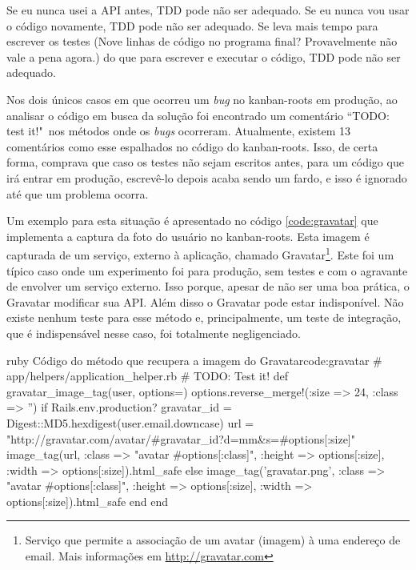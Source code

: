 \begin{citacao}
Se eu nunca usei a API antes, TDD pode não ser adequado. Se eu nunca vou usar o código novamente, TDD pode não ser adequado. Se leva mais tempo para escrever os testes (Nove linhas de código no programa final? Provavelmente não vale a pena agora.) do que para escrever e executar o código, TDD pode não ser adequado.
\end{citacao}

Nos dois únicos casos em que ocorreu um \textit{bug} no kanban-roots em produção, ao analisar o código em busca da solução foi encontrado um comentário ``TODO: test it!"\ nos métodos onde os \textit{bugs} ocorreram. Atualmente, existem 13 comentários como esse espalhados no código do kanban-roots. Isso, de certa forma, comprava que caso os testes não sejam escritos antes, para um código que irá entrar em produção, escrevê-lo depois acaba sendo um fardo, e isso é ignorado até que um problema ocorra.

Um exemplo para esta situação é apresentado no código \ref{code:gravatar} que implementa a captura da foto do usuário no kanban-roots. Esta imagem é capturada de um serviço, externo à aplicação, chamado Gravatar\footnote{Serviço que permite a associação de um avatar (imagem) à uma endereço de email. Mais informações em \url{http://gravatar.com}}. Este foi um típico caso onde um experimento foi para produção, sem testes e com o agravante de envolver um serviço externo. Isso porque, apesar de não ser uma boa prática, o Gravatar modificar sua API. Além disso o Gravatar pode estar indisponível. Não existe nenhum teste para esse método e, principalmente, um teste de integração, que é indispensável nesse caso, foi totalmente negligenciado.

\begin{mycode}{ruby}%
{Código do método que recupera a imagem do Gravatar}{code:gravatar}
# app/helpers/application_helper.rb
# TODO: Test it!
def gravatar_image_tag(user, options={})
  options.reverse_merge!(:size => 24, :class => '')
  if Rails.env.production?
    gravatar_id = Digest::MD5.hexdigest(user.email.downcase)
    url = "http://gravatar.com/avatar/#{gravatar_id}?d=mm&s=#{options[:size]}"
    image_tag(url,
              :class => "avatar #{options[:class]}",
              :height => options[:size],
              :width => options[:size]).html_safe
  else
    image_tag('gravatar.png',
              :class => "avatar #{options[:class]}",
              :height => options[:size],
              :width => options[:size]).html_safe
  end
end
\end{mycode}

